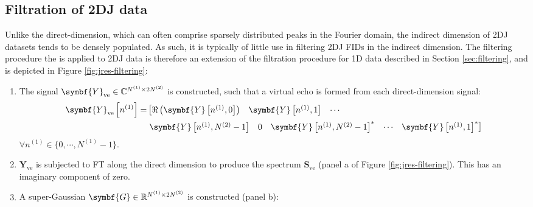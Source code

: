 \subsection{Filtration of \ac{2DJ} data}
Unlike the direct-dimension, which can often comprise sparsely distributed
peaks in the Fourier domain, the indirect dimension of \ac{2DJ} datasets tends
to be densely populated. As such, it is typically of little use in filtering
\ac{2DJ} \acp{FID} in the indirect dimension.
The filtering procedure the is applied to \ac{2DJ} data is therefore an extension of
the filtration procedure for \ac{1D} data described in Section
\ref{sec:filtering}, and is depicted in Figure \ref{fig:jres-filtering}:
\begin{enumerate}
    \item The signal $\symbf{Y}_{\text{ve}} \in \mathbb{C}^{\None \times 2 \Ntwo}$ is
    constructed, such that a virtual echo is formed from each direct-dimension
    signal:
    \begin{equation}
        \begin{split}
            \symbf{Y}_{\text{ve}} \left[n^{(1)}\right] =
                &\left[
                \begin{matrix}
                    \Re\left(\symbf{Y}\left[n^{(1)}, 0\right]\right) &
                    \symbf{Y}\left[n^{(1)}, 1\right] &
                    \cdots
                \end{matrix}\right.
                \\
                &\left.
                \begin{matrix}
                    \symbf{Y}\left[n^{(1)}, \Ntwo - 1\right] &
                    0 &
                    \symbf{Y}\left[n^{(1)}, \Ntwo - 1\right]^* &
                    \cdots &
                    \symbf{Y}\left[n^{(1)}, 1\right]^*
                \end{matrix}
                \right]
        \end{split}
    \end{equation}
    $\forall n^{(1)} \in \lbrace 0, \cdots, N^{(1)} - 1 \rbrace$.
    \item $\symbf{Y}_{\text{ve}}$ is subjected to \ac{FT} along the direct
        dimension to produce the spectrum  $\symbf{S}_{\text{ve}}$ (panel a of
        Figure \ref{fig:jres-filtering}). This has an imaginary component of
        zero.
    \item A super-Gaussian $\symbf{G} \in \mathbb{R}^{\None \times 2 \Ntwo}$ is
        constructed (panel b):
        \begin{equation}

\end{equation}
\end{enumerate}
